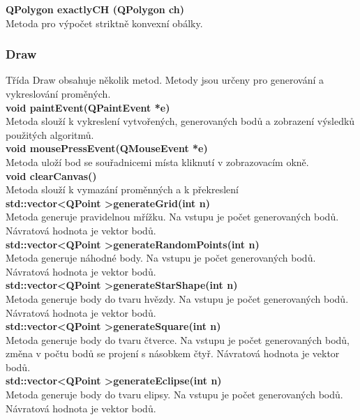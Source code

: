 \documentclass[a4paper, 12pt]{article}
\begin{document}
\textbf{QPolygon exactlyCH (QPolygon ch)}\\
Metoda pro výpočet striktně konvexní obálky.
\\

\subsubsection{Draw}
Třída Draw obsahuje několik metod. Metody jsou určeny pro generování a vykreslování proměných.
\\

\textbf{void paintEvent(QPaintEvent *e)}\\
Metoda slouží k vykreslení vytvořených, generovaných bodů a zobrazení výsledků použitých algoritmů.
\\

\textbf{void mousePressEvent(QMouseEvent *e)}\\
Metoda uloží bod se souřadnicemi místa kliknutí v zobrazovacím okně.
\\

\textbf{void clearCanvas()}\\
Metoda slouží k vymazání proměnných a k překreslení
\\

\textbf{std::vector\textless QPoint \textgreater generateGrid(int n)}\\
Metoda generuje pravidelnou mřížku. Na vstupu je počet generovaných bodů. Návratová hodnota je vektor bodů.\\

\textbf{std::vector\textless QPoint \textgreater generateRandomPoints(int n)}\\
Metoda generuje náhodné body. Na vstupu je počet generovaných bodů. Návratová hodnota je vektor bodů.\\

\textbf{std::vector\textless QPoint \textgreater generateStarShape(int n)}\\
Metoda generuje body do tvaru hvězdy. Na vstupu je počet generovaných bodů. Návratová hodnota je vektor bodů.\\

\textbf{std::vector\textless QPoint \textgreater generateSquare(int n)}\\
Metoda generuje body do tvaru čtverce. Na vstupu je počet generovaných bodů, změna v počtu bodů se projení s násobkem čtyř. Návratová hodnota je vektor bodů.\\

\textbf{std::vector\textless QPoint \textgreater generateEclipse(int n)}\\
Metoda generuje body do tvaru elipsy. Na vstupu je počet generovaných bodů. Návratová hodnota je vektor bodů.\\
\end{document}
